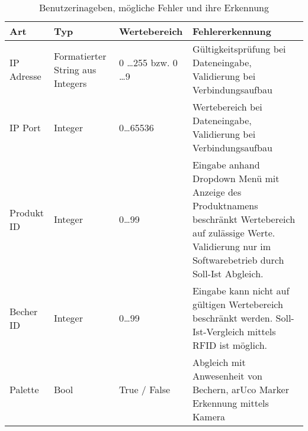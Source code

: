 \begin{table}[h]
\centering
\caption{Benutzerinageben, mögliche Fehler und ihre Erkennung}
\begin{tabularx}{\textwidth}{|l|p{2cm}|p{2cm}|X|}
\hline
Art & Typ & Wertebereich & Fehlererkennung \\
\hline
IP Adresse & Formatierter String aus Integers & 0 \ldots 255 bzw. 0 \ldots 9 & Gültigkeitsprüfung bei Dateneingabe, Validierung bei Verbindungsaufbau\\
\hline
IP Port & Integer & 0\ldots65536 & Wertebereich bei Dateneingabe, Validierung bei Verbindungsaufbau\\
\hline
Produkt ID & Integer & 0\ldots99 & Eingabe anhand Dropdown Menü mit Anzeige des Produktnamens beschränkt Wertebereich auf zulässige Werte. Validierung nur im Softwarebetrieb durch Soll-Ist Abgleich.\\
\hline
Becher ID & Integer & 0\ldots99 & Eingabe kann nicht auf gültigen Wertebereich beschränkt werden. Soll-Ist-Vergleich mittels RFID ist möglich.\\
\hline
Palette & Bool & True / False & Abgleich mit Anwesenheit von Bechern, arUco Marker Erkennung mittels Kamera\\
\hline
\end{tabularx}\label{tab:Benutzereingaben}
\end{table}

